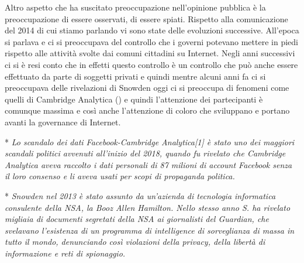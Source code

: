  Altro aspetto che ha suscitato preoccupazione nell'opinione pubblica è la preoccupazione di essere osservati, di essere spiati. Rispetto alla comunicazione del 2014 di cui stiamo parlando vi sono state delle evoluzioni successive. All'epoca si parlava e ci si preoccupava del controllo che i governi potevano mettere in piedi rispetto alle attività svolte dai comuni cittadini su Internet. Negli anni successivi ci si è resi conto che in effetti questo controllo è un controllo che può anche essere effettuato da parte di soggetti privati e quindi mentre alcuni anni fa ci si preoccupava delle rivelazioni di Snowden oggi ci si preoccupa di fenomeni come quelli di Cambridge Analytica () e quindi l'attenzione dei partecipanti è comunque massima e così anche l'attenzione di coloro che sviluppano e portano avanti la governance di Internet. \par
 
 *\textit{ Lo scandalo dei dati Facebook-Cambridge Analytica[1] è stato uno dei maggiori scandali politici avvenuti all'inizio del 2018, quando fu rivelato che Cambridge Analytica aveva raccolto i dati personali di 87 milioni di account Facebook senza il loro consenso e li aveva usati per scopi di propaganda politica.}\par
 
 
* \textit{Snowden nel 2013 è stato assunto da un'azienda di tecnologia informatica consulente della NSA, la Booz Allen Hamilton. Nello stesso anno S. ha rivelato migliaia di documenti segretati della NSA ai giornalisti del Guardian, che svelavano l’esistenza di un programma di intelligence di sorveglianza di massa in tutto il mondo, denunciando così violazioni della privacy, della libertà di informazione e reti di spionaggio.}
 
